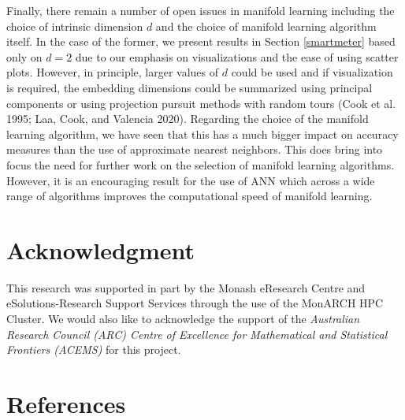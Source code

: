 \documentclass[12pt]{article}
\begin{document}
Finally, there remain a number of open issues in manifold learning including the choice of intrinsic dimension \(d\) and the choice of manifold learning algorithm itself. In the case of the former, we present results in Section \ref{smartmeter} based only on \(d=2\) due to our emphasis on visualizations and the ease of using scatter plots. However, in principle, larger values of \(d\) could be used and if visualization is required, the embedding dimensions could be summarized using principal components or using projection pursuit methods with random tours (Cook et al. 1995; Laa, Cook, and Valencia 2020). Regarding the choice of the manifold learning algorithm, we have seen that this has a much bigger impact on accuracy measures than the use of approximate nearest neighbors. This does bring into focus the need for further work on the selection of manifold learning algorithms. However, it is an encouraging result for the use of ANN which across a wide range of algorithms improves the computational speed of manifold learning.

\hypertarget{acknowledgment}{%
\section*{Acknowledgment}\label{acknowledgment}}

This research was supported in part by the Monash eResearch Centre and eSolutions-Research Support Services through the use of the MonARCH HPC Cluster.
We would also like to acknowledge the support of the \emph{Australian Research Council (ARC) Centre of Excellence for Mathematical and Statistical Frontiers (ACEMS)} for this project.

\clearpage

\hypertarget{references}{%
\section*{References}\label{references}}
\end{document}
